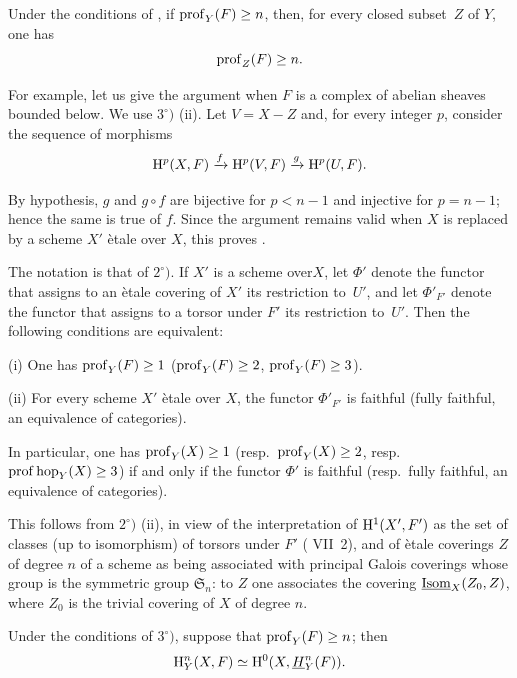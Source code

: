 \begin{corollaire} \label{XIV.1.3}
Under the conditions of , if $\operatorname{prof}_Y(F)\geq n$, then, for every closed subset~$Z$ of $Y$, one has
$$
\operatorname{prof}_Z(F)\geq n.
$$
\end{corollaire}

For example, let us give the argument when $F$ is a complex of abelian sheaves bounded below. We use  $3^\circ)$ \textup{(ii)}. Let $V=X-Z$ and, for every integer $p$, consider the sequence of morphisms
$$
\mathrm H^p(X, F)\xrightarrow{f} \mathrm H^p(V, F)\xrightarrow{g} \mathrm H^p(U, F).
$$

By hypothesis, $g$ and $g\circ f$ are bijective for $p<n-1$ and injective for $p=n-1$; hence the same is true of $f$. Since the argument remains valid when $X$ is replaced by a scheme $X'$ \`etale over $X$, this proves .

\begin{corollaire} \label{XIV.1.4} The notation is that of  $2^\circ)$. If $X'$ is a scheme over\pageoriginale $X$, let $\Phi'$ denote the functor that assigns to an \`etale covering of $X'$ its restriction to~$U'$, and let $\Phi'_{F'}$ denote the functor that assigns to a torsor under $F'$ its restriction to~$U'$. Then the following conditions are equivalent:

\textup{(i)} One has $\operatorname{prof}_Y(F)\geq 1$ (\resp $\operatorname{prof}_Y(F)\geq 2$, \resp $\operatorname{prof}_Y(F)\geq 3$).

\textup{(ii)} For every scheme $X'$ \`etale over $X$, the functor $\Phi'_{F'}$ is faithful (\resp fully faithful, \resp an equivalence of categories).

In particular, one has $\operatorname{prof}_Y({X})\geq 1$ (resp.\ $\operatorname{prof}_Y({X})\geq 2$, resp.\ $\operatorname{prof} \operatorname{hop}_Y(X)\geq 3$) if and only if the functor $\Phi'$ is faithful (resp.\ fully faithful, \resp an equivalence of categories).
\end{corollaire}

This follows from  $2^\circ)$ \textup{(ii)}, in view of the interpretation of $\mathrm H^1(X', F')$ as the set of classes (up to isomorphism) of torsors under $F'$ ( VII~2), and of \`etale coverings $Z$ of degree $n$ of a scheme as being associated with principal Galois coverings whose group is the symmetric group $\mathfrak{S}_n$: to $Z$ one associates the covering $\underline{\textup{Isom}}_X(Z_0, Z)$, where $Z_0$ is the trivial covering of $X$ of degree $n$.

\begin{corollaire} \label{XIV.1.5} Under the conditions of  $3^\circ)$, suppose that $\operatorname{prof}_Y(F)\geq n$; then
$$
\mathrm H_Y^n(X, F)\simeq \mathrm H^0(X, {\mathop{\underline{H}}\nolimits}_Y^n(F)).
$$
\end{corollaire}

